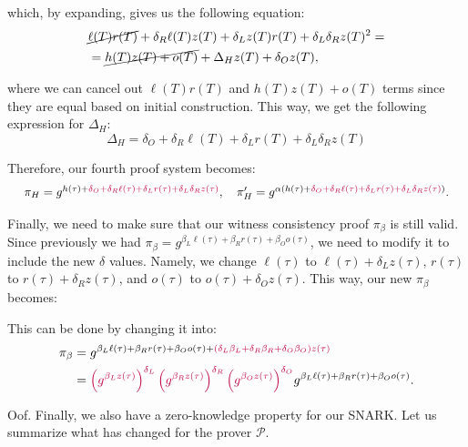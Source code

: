 \documentclass[../../book.tex]{subfiles}
\begin{document}
which, by expanding, gives us the following equation:
\begin{equation*}
    \begin{aligned}
        &\cancel{\ell(T)r(T)} + \delta_R \ell(T)z(T) + \delta_L z(T)r(T) + \delta_L \delta_R z(T)^2 = \\ 
        &= \cancel{h(T)z(T) + o(T)} + \Delta_Hz(T) + \delta_O z(T), \\
    \end{aligned}
\end{equation*}

where we can cancel out $\ell(T)r(T)$ and $h(T)z(T) + o(T)$ terms since they are equal based on initial construction. This way, we get the following expression for $\Delta_H$:
\begin{equation*}
    \Delta_H = \delta_O + \delta_R \ell(T) + \delta_L r(T) + \delta_L \delta_R z(T)
\end{equation*}

Therefore, our fourth proof system becomes:
\begin{equation*}
    \scalebox{0.95}{$
    \pi_H = g^{h(\tau) + \textcolor{purple}{\delta_O + \delta_R \ell(\tau) + \delta_L r(\tau) + \delta_L \delta_R z(\tau)}}, \quad \pi_H' = g^{\alpha(h(\tau) + \textcolor{purple}{\delta_O + \delta_R \ell(\tau) + \delta_L r(\tau) + \delta_L \delta_R z(\tau)})}.
    $}
\end{equation*}

Finally, we need to make sure that our witness consistency proof $\pi_{\beta}$ is still valid. Since previously we had $\pi_{\beta} = g^{\beta_L\ell(\tau) + \beta_Rr(\tau) + \beta_Oo(\tau)}$, we need to modify it to include the new $\delta$ values. Namely, we change $\ell(\tau)$ to $\ell(\tau)+\delta_Lz(\tau)$, $r(\tau)$ to $r(\tau)+\delta_Rz(\tau)$, and $o(\tau)$ to $o(\tau)+\delta_Oz(\tau)$. This way, our new $\pi_{\beta}$ becomes:

This can be done by changing it into:
\begin{align*}
    \pi_{\beta} &= g^{\beta_L\ell(\tau) + \beta_Rr(\tau) + \beta_Oo(\tau) + \textcolor{purple}{(\delta_L\beta_L + \delta_R\beta_R + \delta_O\beta_O)z(\tau)}} \\&= \textcolor{purple}{\left(g^{\beta_L z(\tau)}\right)^{\delta_L}\left(g^{\beta_R z(\tau)}\right)^{\delta_R}\left(g^{\beta_O z(\tau)}\right)^{\delta_O}}g^{\beta_L\ell(\tau) + \beta_Rr(\tau) + \beta_Oo(\tau)}.
\end{align*}

Oof. Finally, we also have a zero-knowledge property for our SNARK. Let us summarize what has changed for the prover $\mathcal{P}$.
\end{document}
